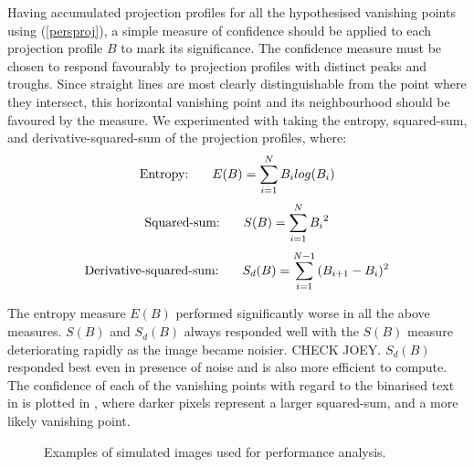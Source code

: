 Having accumulated projection profiles for all the hypothesised vanishing points
using (\ref{persproj}), a simple measure of confidence should be
applied to each projection profile $B$ to mark its significance.
The confidence measure must be chosen to respond favourably to projection profiles
with distinct peaks and troughs.
Since straight lines are most clearly distinguishable from the point where they
intersect, this horizontal vanishing point and its neighbourhood should be
favoured by the measure. We experimented with taking the entropy, squared-sum, and
derivative-squared-sum of the projection profiles, where:
\begin{equation} \mbox{Entropy: } \hspace*{5mm} E(B) = \sum_{i=1}^{N}{B_{i} log(B_{i})} \end{equation}
\begin{equation} \mbox{Squared-sum: } \hspace*{5mm} S(B) = \sum_{i=1}^{N}{{B_{i}}^{2}} \end{equation}
\begin{equation} \mbox{Derivative-squared-sum: } \hspace*{5mm} S_d(B) = \sum_{i=1}^{N-1}{{(B_{i+1}-B_{i}})^{2}} \end{equation}


The entropy measure $E(B)$ performed significantly worse in all the above
measures.  $S(B)$ and $S_d(B)$ always responded well with the $S(B)$ measure
deteriorating rapidly as the image became noisier. CHECK JOEY.  $S_d(B)$
responded best even in presence of noise and is also more efficient to compute.
The confidence of each of the vanishing points with regard to the binarised text
in  is plotted in , where darker pixels represent a
larger squared-sum, and a more likely vanishing point.

\begin{figure}[b!]
\centering
\begin{center}
\end{center}
\vspace*{0mm}
\caption{Examples of simulated images used for performance analysis.}
\label{simimages}
\end{figure}

